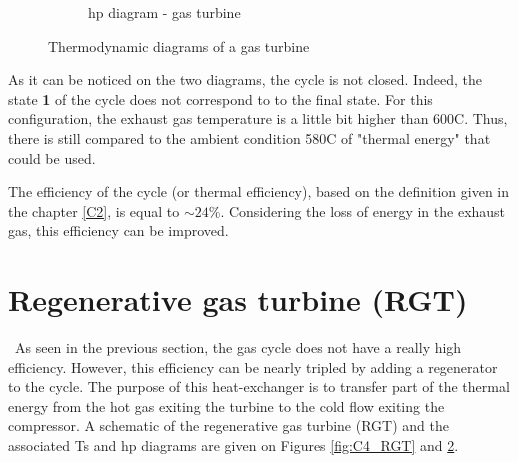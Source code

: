 \begin{figure}[h]
\begin{subfigure}[b]{0.4\textwidth}
         \caption{hp diagram - gas turbine}
         \label{fig:C4_hp_GT}
     \end{subfigure}
        \caption{Thermodynamic diagrams of a gas turbine}
        \label{fig:C4_thermo_diagram_GT}
\end{figure}\newpage


As it can be noticed on the two diagrams, the cycle is not closed. Indeed, the state \textbf{1} of the cycle does not correspond to to the final state. For this configuration, the exhaust gas temperature is a little bit higher than 600\degree C. Thus, there is still compared to the ambient condition 580\degree C of "thermal energy" that could be used.

The efficiency of the cycle (or thermal efficiency), based on the definition given in the chapter \ref{C2}, is equal to $\sim 24$\%. Considering the loss of energy in the exhaust gas, this efficiency can be improved.

\section{Regenerative gas turbine (RGT)}
\quad\, As seen in the previous section, the gas cycle does not have a really high efficiency. However, this efficiency can be nearly tripled by adding a regenerator to the cycle. The purpose of this heat-exchanger is to transfer part of the thermal energy from the hot gas exiting the turbine to the cold flow exiting the compressor. A schematic of the regenerative gas turbine (RGT) and the associated Ts and hp diagrams are given on Figures \ref{fig:C4_RGT} and \ref{fig:C4_thermo_diagram_GT}. 

